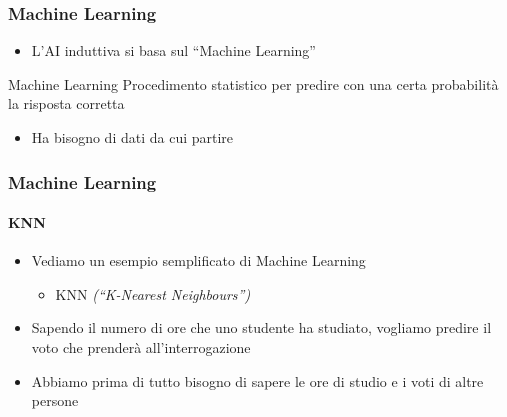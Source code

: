 \begin{contentframe}
    \frametitle{Machine Learning}

    \begin{itemize}
        \item L'AI induttiva si basa sul ``Machine Learning''
    \end{itemize}

    \bigskip
    \begin{block}{Machine Learning}
        Procedimento statistico per predire con una certa probabilità la risposta corretta
        \begin{itemize}
            \item Ha bisogno di dati da cui partire
        \end{itemize}
    \end{block}
\end{contentframe}

\begin{contentframe}
    \frametitle{Machine Learning}
    \framesubtitle{KNN}

    \begin{itemize}
        \item Vediamo un esempio semplificato di Machine Learning
        \begin{itemize}
            \item KNN \textit{(``K-Nearest Neighbours'')}
        \end{itemize}

        \bigskip
        \item Sapendo il numero di ore che uno studente ha studiato, vogliamo predire il voto che prenderà all'interrogazione

        \bigskip
        \item Abbiamo prima di tutto bisogno di sapere le ore di studio e i voti di altre persone
    \end{itemize}
\end{contentframe}

